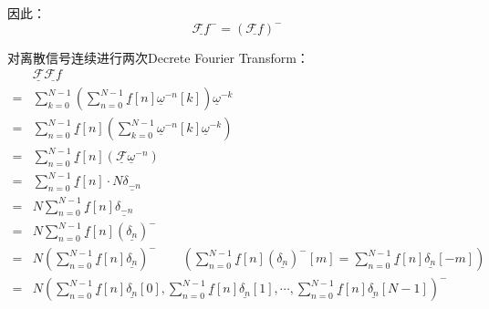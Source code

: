因此：
\begin{equation}
	\underline{\mathcal{F}f}^- = \left( \underline{\mathcal{F}f} \right)^-
\end{equation}

对离散信号连续进行两次Decrete Fourier Transform：
\begin{align*}
	  & \underline{\mathcal{F}}\underline{\mathcal{F}f}                                                                                                                                                             \\
	= & \sum_{k=0}^{N-1}\left(\sum_{n=0}^{N-1}\underline{f}[n]\underline{\omega}^{-n}[k]\right)\underline{\omega}^{-k}                                                                                              \\
	= & \sum_{n=0}^{N-1}\underline{f}[n]\left(\sum_{k=0}^{N-1}\underline{\omega}^{-n}[k]\underline{\omega}^{-k}\right)                                                                                              \\
	= & \sum_{n=0}^{N-1}\underline{f}[n]\left(\underline{\mathcal{F}}\underline{\omega}^{-n}\right)                                                                                                                 \\
	= & \sum_{n=0}^{N-1}\underline{f}[n]\cdot N\underline{\delta_{-n}}                                                                                                                                              \\
	= & N\sum_{n=0}^{N-1}\underline{f}[n]\underline{\delta_{-n}}                                                                                                                                                    \\
	= & N\sum_{n=0}^{N-1}\underline{f}[n]\left(\underline{\delta_n}\right)^-                                                                                                                                        \\
	= & N\left(\sum_{n=0}^{N-1}\underline{f}[n]\underline{\delta_n}\right)^-\qquad\left(\sum_{n=0}^{N-1}\underline{f}[n](\underline{\delta_n})^-[m]=\sum_{n=0}^{N-1}\underline{f}[n]\underline{\delta_n}[-m]\right) \\
	= & N\left(\sum_{n=0}^{N-1}\underline{f}[n]\underline{\delta_n}[0],\sum_{n=0}^{N-1}\underline{f}[n]\underline{\delta_n}[1],\cdots,\sum_{n=0}^{N-1}\underline{f}[n]\underline{\delta_n}[N-1]\right)^-
\end{align*}

